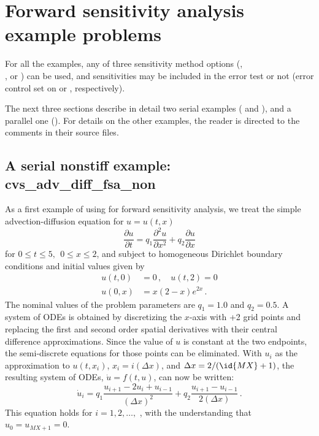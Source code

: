 \section{Forward sensitivity analysis example problems}\label{s:fwd_ex}

For all the {\cvodes} examples, any of three sensitivity method options
(, \\
, or ) can be used, and sensitivities may be 
included in the error test or not (error control set on  or ,
respectively).

The next three sections describe in detail two serial examples
( and ), 
and a parallel one ().
For details on the other examples, the reader is directed to the comments in
their source files.

\subsection{A serial nonstiff example: cvs\_adv\_diff\_fsa\_non}
\label{ss:cvs_adv_diff_fsa_non}

As a first example of using {\cvodes} for forward sensitivity analysis,
we treat the simple advection-diffusion equation
for $u=u(t,x)$
\begin{equation}\label{e:cvs_adv_diff_fsa_non_PDE}
  \frac{\partial u}{\partial t}= q_1 \frac{\partial ^{2}u}{\partial x^{2}}
  + q_2 \frac{\partial u}{\partial x}
\end{equation}
for $0 \leq t \leq 5, ~~ 0\leq x \leq 2$, and subject to homogeneous
Dirichlet boundary conditions and initial values given by 
\begin{equation}\label{e:cvs_adv_diff_fsa_non_BC_IC}
  \begin{split}
    u(t,0) &= 0 \, , \quad u(t,2) = 0 \\
    u(0,x) &= x(2-x)e^{2x} \, .
  \end{split}
\end{equation}
The nominal values of the problem parameters are $q_1 = 1.0$ and $q_2 = 0.5$.
A system of  ODEs is obtained by discretizing the $x$-axis with +2
grid points and replacing the first and second order spatial derivatives
with their central difference approximations. Since the value of $u$ is
constant at the two endpoints, the semi-discrete equations for those points
can be eliminated.  With $u_{i}$ as the approximation to $u(t,x_{i})$, 
$x_{i} = i(\Delta x)$, and $\Delta x=2/(\id{MX}+1)$, the resulting system of
ODEs, ${\dot u} = f(t,u)$, can now be written:
\begin{equation}\label{e:cvs_adv_diff_fsa_non_ODE}
  {\dot u}_i= q_1 \frac{u_{i+1}-2u_{i}+u_{i-1}}{(\Delta x)^{2}}
  + q_2 \frac{u_{i+1}-u_{i-1}}{2(\Delta x)} \, .
\end{equation}
This equation holds for $i=1,2,\ldots ,$ , with the understanding
that $u_{0} = u_{MX+1}=0.$

